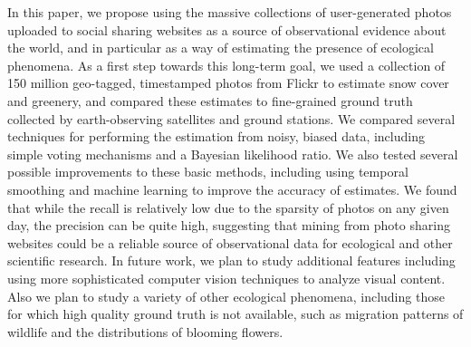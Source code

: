 \documentclass[10pt,journal,compsoc]{IEEEtran}
\begin{document}



In this paper, we propose using the massive collections of
user-generated photos uploaded to social sharing websites as a source
of observational evidence about the world, and in particular as a way
of estimating the presence of ecological phenomena. As a first step
towards this long-term goal, we used a collection of 150 million
geo-tagged, timestamped photos from Flickr to estimate snow 
cover and greenery, and compared these estimates to fine-grained
ground truth collected by earth-observing satellites and ground stations. We compared
several techniques for performing the estimation from noisy, biased
data, including simple voting mechanisms and a Bayesian likelihood
ratio. We also tested several possible improvements to these basic
methods, including using temporal smoothing
and machine learning to improve the accuracy of estimates. We found
that while the recall is relatively low due to the sparsity of photos
on any given day, the precision can be quite high, suggesting that
mining from photo sharing websites could be a reliable source of
observational data for ecological and other scientific research. In
future work, we plan to study additional features including using
more sophisticated computer vision techniques to analyze visual content. Also we plan to study a variety of other ecological phenomena,
including those for which high quality ground truth is not available,
such as migration patterns of wildlife and the distributions of
blooming flowers.






\end{document}
